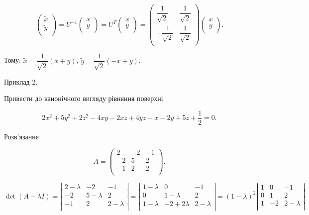 $$\begin{pmatrix}
	\tilde{x} \\
	\tilde{y} \\
\end{pmatrix} = U^{-1} \begin{pmatrix}
	x \\
	y \\
\end{pmatrix} = U^T \begin{pmatrix}
	x \\
	y \\
\end{pmatrix} = \begin{pmatrix}
	\dfrac{1}{\sqrt{2}} & \dfrac{1}{\sqrt{2}} \\
	-\dfrac{1}{\sqrt{2}} & \dfrac{1}{\sqrt{2}} \\
\end{pmatrix} \begin{pmatrix}
	x \\
	y \\
\end{pmatrix}.$$

Тому: $\tilde{x} = \dfrac{1}{\sqrt{2}}(x + y)$, $\tilde{y} = \dfrac{1}{\sqrt{2}}(-x + y)$.

Приклад 2.

Привести до канонічного вигляду рівняння поверхні

$$2x^2 + 5y^2 + 2z^2 - 4xy - 2xz  + 4yz + x - 2y + 5z + \dfrac{1}{2} = 0.$$

Розв’язання

$$A = \begin{pmatrix}
	 2 & -2 & -1 \\
	-2 &  5 &  2 \\
	-1 &  2 &  2 \\
\end{pmatrix}.$$

$\det(A - \lambda I) = \left| \begin{matrix}
	2 - \lambda & -2 & -1 \\
	-2 & 5 - \lambda & 2 \\
	-1 & 2 & 2 - \lambda \\
\end{matrix} \right| = \left| \begin{matrix}
	1 - \lambda & 0 & -1 \\
	0 & 1 - \lambda & 2 \\
	1 - \lambda & -2 + 2\lambda & 2 - \lambda \\
\end{matrix} \right| = (1 - \lambda)^2 \left| \begin{matrix}
	1 & 0 & -1 \\
	0 & 1 & 2 \\
	1 & -2 & 2 - \lambda \\
\end{matrix} \right|$

